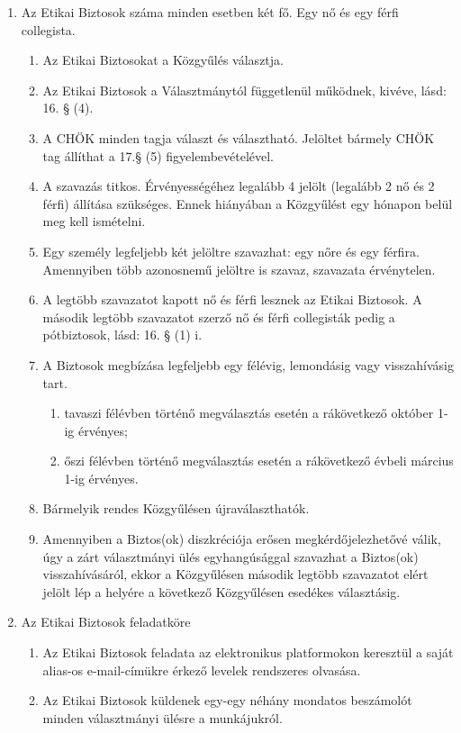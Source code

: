 \documentclass{../styles/rulebook}
\begin{document}
\begin{enumerate}
	\item Az Etikai Biztosok száma minden esetben két fő. Egy nő és egy férfi collegista.
	\begin{enumerate}
		\item Az Etikai Biztosokat a Közgyűlés választja.
		\item Az Etikai Biztosok a Választmánytól függetlenül működnek, kivéve, lásd: 16. § (4).
		\item A CHÖK minden tagja választ és választható. Jelöltet bármely CHÖK tag állíthat a 17.§ (5) figyelembevételével.
		\item A szavazás titkos. Érvényességéhez legalább 4 jelölt (legalább 2 nő és 2 férfi) állítása szükséges. Ennek hiányában a Közgyűlést egy hónapon belül meg kell ismételni.
		\item Egy személy legfeljebb két jelöltre szavazhat: egy nőre és egy férfira. Amennyiben több azonosnemű jelöltre is szavaz, szavazata érvénytelen.
		\item A legtöbb szavazatot kapott nő és férfi lesznek az Etikai Biztosok. A második legtöbb szavazatot szerző nő és férfi collegisták pedig a pótbiztosok, lásd: 16. § (1) i. 
		\item A Biztosok megbízása legfeljebb egy félévig, lemondásig vagy visszahívásig tart. 
		\begin{enumerate}
			\item tavaszi félévben történő megválasztás esetén a rákövetkező október 1-ig érvényes;
			\item őszi félévben történő megválasztás esetén a rákövetkező évbeli március 1-ig érvényes.
		\end{enumerate}
		\item Bármelyik rendes Közgyűlésen újraválaszthatók.
		\item Amennyiben a Biztos(ok) diszkréciója erősen megkérdőjelezhetővé válik, úgy a zárt választmányi ülés egyhangúsággal szavazhat a Biztos(ok) visszahívásáról, ekkor a Közgyűlésen második legtöbb szavazatot elért jelölt lép a helyére a következő Közgyűlésen esedékes választásig.
	\end{enumerate}
	\item Az Etikai Biztosok feladatköre
	\begin{enumerate}
		\item Az Etikai Biztosok feladata az elektronikus platformokon keresztül a saját alias-os e-mail-címükre érkező levelek rendszeres olvasása. 
		\item Az Etikai Biztosok küldenek egy-egy néhány mondatos beszámolót minden választmányi ülésre a munkájukról.

\end{enumerate}
\end{enumerate}
\end{document}

